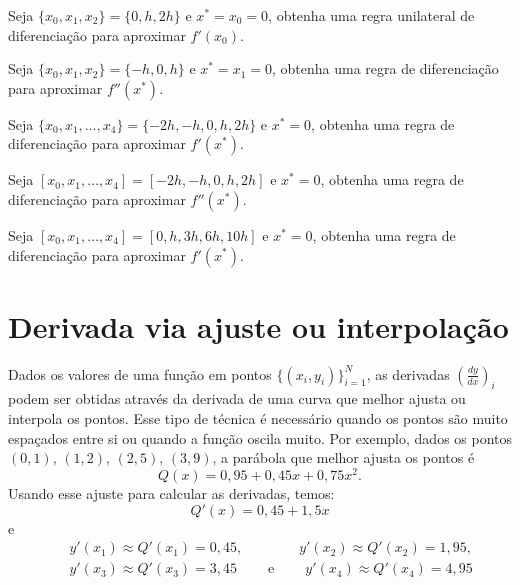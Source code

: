 \begin{exer}
Seja $\{x_0, x_1, x_2\}=\{0, h, 2h\}$ e $x^*=x_0=0$, obtenha uma regra unilateral de diferenciação para aproximar $f'(x_0)$.
\end{exer}

\begin{exer}
Seja $\{x_0, x_1, x_2\}=\{-h, 0, h\}$ e $x^*=x_1=0$, obtenha uma regra de diferenciação para aproximar $f''(x^*)$.
\end{exer}

\begin{exer}
Seja $\{x_0, x_1, \ldots, x_4\}=\{-2h, -h, 0, h, 2h\}$ e $x^*=0$, obtenha uma regra de diferenciação para aproximar $f'(x^*)$.
\end{exer}

\begin{exer}
Seja $[x_0,x_1,\ldots ,x_4]=[-2h,-h,0,h,2h]$ e $x^*=0$, obtenha uma regra de diferenciação para aproximar $f''(x^*)$.
\end{exer}

\begin{exer}
Seja $[x_0,x_1,\ldots ,x_4]=[0,h,3h,6h,10h]$ e $x^*=0$, obtenha uma regra de diferenciação para aproximar $f'(x^*)$.
\end{exer}

\section{Derivada via ajuste ou interpolação}

Dados os valores de uma função em pontos $\{(x_i,y_i)\}_{i=1}^N$, as derivadas $\left(\frac{dy}{dx}\right)_i$ podem ser obtidas através da derivada de uma curva que melhor ajusta ou interpola os pontos. Esse tipo de técnica é necessário quando os pontos são muito espaçados entre si ou quando a função oscila muito. Por exemplo, dados os pontos $(0,1)$, $(1,2)$, $(2,5)$, $(3,9)$, a parábola que melhor ajusta os pontos é
$$
Q(x)=0,95 + 0,45x + 0,75x^2.
$$
Usando esse ajuste para calcular as derivadas, temos:
$$
Q'(x)=0,45 + 1,5x
$$
e
\begin{eqnarray*}
&&y'(x_1)\approx Q'(x_1)=0,45, \qquad\qquad y'(x_2)\approx Q'(x_2)=1,95, \\&& y'(x_3)\approx Q'(x_3)=3,45 \qquad ~ \text{e} ~ \qquad y'(x_4)\approx Q'(x_4)=4,95
\end{eqnarray*}

